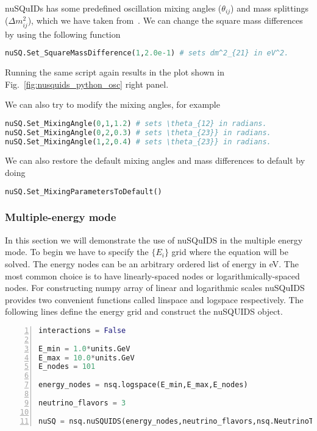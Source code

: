 \documentclass[3p,12pt]{elsarticle}
\newcommand{\ttf}{\ttfamily}
\begin{document}
nuSQuIDs has some predefined oscillation mixing angles ($\theta_{ij}$) and mass splittings ($\Delta m^2_{ij}$),
which we have taken from~\cite{Esteban:2020cvm,Gonzalez-Garcia:2021dve}.
We can change the square mass differences by using the following function
\begin{lstlisting}[language=Python, breaklines=true]
nuSQ.Set_SquareMassDifference(1,2.0e-1) # sets dm^2_{21} in eV^2.
\end{lstlisting}

Running the same script again results in the plot shown in Fig.~\ref{fig:nusquids_python_osc} right panel.

We can also try to modify the mixing angles, for example
\begin{lstlisting}[language=Python, breaklines=true]
nuSQ.Set_MixingAngle(0,1,1.2) # sets \theta_{12} in radians.
nuSQ.Set_MixingAngle(0,2,0.3) # sets \theta_{23}} in radians.
nuSQ.Set_MixingAngle(1,2,0.4) # sets \theta_{23}} in radians.
\end{lstlisting}
We can also restore the default mixing angles and mass differences to default by doing
\begin{lstlisting}[language=Python, breaklines=true]
nuSQ.Set_MixingParametersToDefault()
\end{lstlisting}

\subsubsection{Multiple-energy mode}

In this section we will demonstrate the use of {\ttf nuSQuIDS} in the multiple energy mode.
To begin we have to specify the $\{E_i\}$ grid where the equation will be solved.
The energy nodes can be an arbitrary ordered list of energy in eV.
The most common choice is to have linearly-spaced nodes or logarithmically-spaced nodes.
For constructing numpy array of linear and logarithmic scales nuSQuIDS provides two
 convenient functions called {\ttf linspace} and {\ttf logspace }respectively. The 
following lines define the energy grid and construct the nuSQUIDS object.

\begin{lstlisting}[language=Python, frame=leftline, numbers=left, breaklines=true]
interactions = False

E_min = 1.0*units.GeV
E_max = 10.0*units.GeV
E_nodes = 101

energy_nodes = nsq.logspace(E_min,E_max,E_nodes)

neutrino_flavors = 3

nuSQ = nsq.nuSQUIDS(energy_nodes,neutrino_flavors,nsq.NeutrinoType.neutrino,interactions)
\end{lstlisting}
\end{document}
